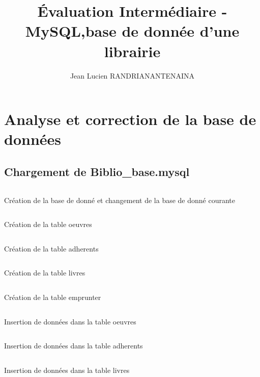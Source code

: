 \documentclass{article}
\title{Évaluation Intermédiaire - MySQL,base de donnée d’une librairie}
\author{Jean Lucien RANDRIANANTENAINA}
\begin{document}
\maketitle
\newpage
\tableofcontents
\newpage
\listoflistings
\newpage

\section{Analyse et correction de la base de données}

\subsection{Chargement de Biblio\_base.mysql}

\begin{listing}[H]
\inputminted{mysql}{code/create_db.sql}
\caption{Création de la base de donné  et changement de la base de donné courante}
\end{listing}

\begin{listing}[H]
\inputminted{mysql}{code/create_oeuvres.sql}
\caption{Création de la table oeuvres}
\end{listing}

\begin{listing}[H]
\inputminted{mysql}{code/create_adherents.sql}
\caption{Création de la table adherents}
\end{listing}

\begin{listing}[H]
\inputminted{mysql}{code/create_livres.sql}
\caption{Création de la table livres}
\end{listing}

\begin{listing}[H]
\inputminted{mysql}{code/create_emprunter.sql}
\caption{Création de la table emprunter}
\end{listing}

\begin{listing}[H]
\inputminted{mysql}{code/insert_oeuvres.sql}
\caption{Insertion de données dans la table oeuvres}
\end{listing}

\begin{listing}[H]
\inputminted{mysql}{code/insert_adherents.sql}
\caption{Insertion de données dans la table adherents}
\end{listing}

\newpage
\begin{listing}[H]
\inputminted{mysql}{code/insert_livres.sql}
\caption{Insertion de données dans la table livres}
\end{listing}
\end{document}
